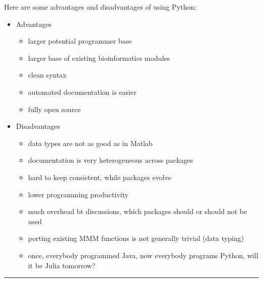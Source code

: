 \documentclass[letterpaper,10pt,english]{sphinxmanual}
\begin{document}
Here are some advantages and disadvantages of using Python:
\begin{itemize}
\item {} 
Advantages
\begin{itemize}
\item {} 
larger potential programmer base

\item {} 
larger base of existing bioinformatics modules

\item {} 
clean syntax

\item {} 
automated documentation is easier

\item {} 
fully open source

\end{itemize}

\item {} 
Disadvantages
\begin{itemize}
\item {} 
data types are not as good as in Matlab

\item {} 
documentation is very heterogeneous across packages

\item {} 
hard to keep consistent, while packages evolve

\item {} 
lower programming productivity

\item {} 
much overhead bt discussions, which packages should or should not be used

\item {} 
porting existing MMM functions is not generally trivial (data typing)

\item {} 
once, everybody programmed Java, now everybody programs Python, will it be Julia tomorrow?

\end{itemize}

\end{itemize}


\bigskip\hrule\bigskip
\end{document}
